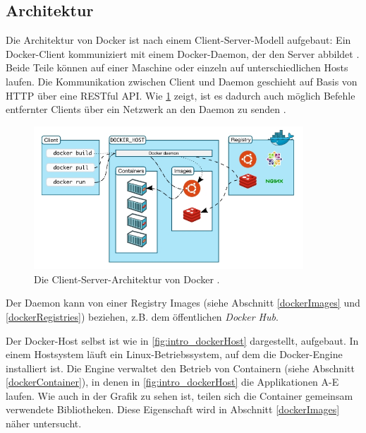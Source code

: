 \documentclass[../main.tex]{subfiles}
\begin{document}
		\subsection{Architektur}
		\label{dockerArchitecture}
      Die Architektur von Docker ist nach einem Client-Server-Modell aufgebaut: Ein Docker-Client kommuniziert mit einem Docker-Daemon, der den Server abbildet \cite{dockerUnderstandingDocker}. Beide Teile können auf einer Maschine oder einzeln auf unterschiedlichen Hosts laufen. Die Kommunikation zwischen Client und Daemon geschieht auf Basis von \acrshort{HTTP} über eine \acrshort{REST}ful \acrshort{API}. Wie \fig \ref{fig:intro_dockerArchitecture} zeigt, ist es dadurch auch möglich Befehle entfernter Clients über ein Netzwerk an den Daemon zu senden \cite[S.3]{dockerSecIntro}.

      \begin{figure}[h]
          \centering
          \includegraphics[width=0.9\textwidth]{./images/intro_dockerArchitecture.jpg}
          \caption{Die Client-Server-Architektur von Docker \cite{dockerUnderstandingDocker}.}
          \label{fig:intro_dockerArchitecture}
      \end{figure}

      Der Daemon kann von einer Registry Images (siehe Abschnitt \ref{dockerImages} und \ref{dockerRegistries}) beziehen, z.B. dem öffentlichen \emph{Docker Hub}.

      Der Docker-Host selbst ist wie in \fig \ref{fig:intro_dockerHost} dargestellt, aufgebaut. In einem Hostsystem läuft ein Linux-Betriebssystem, auf dem die Docker-Engine installiert ist. Die Engine verwaltet den Betrieb von Containern (siehe Abschnitt \ref{dockerContainer}), in denen in \fig \ref{fig:intro_dockerHost} die Applikationen A-E laufen. Wie auch in der Grafik zu sehen ist, teilen sich die Container gemeinsam verwendete Bibliotheken. Diese Eigenschaft wird in Abschnitt \ref{dockerImages} näher untersucht.
\end{document}
